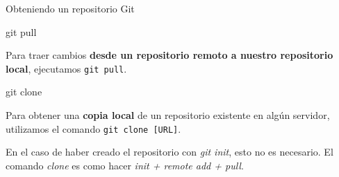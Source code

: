 \begin{frame}[t]{Obteniendo un repositorio Git}
        \begin{comando}
        git pull
    \end{comando}

    \begin{block}{}
        Para traer cambios \textbf{desde un repositorio remoto a nuestro repositorio local},
        ejecutamos \texttt{git pull}.
    \end{block}
    \pause
    \begin{comando}
        git clone
    \end{comando}

	\begin{block}{}
        Para obtener una \textbf{copia local} de un repositorio existente en algún servidor,
        utilizamos el comando \texttt{git clone [URL]}.

        En el caso de haber creado el repositorio con \textit{git init}, esto no es necesario. El comando \textit{clone} es como hacer \textit{init + remote add + pull}.
    \end{block}
\end{frame}



